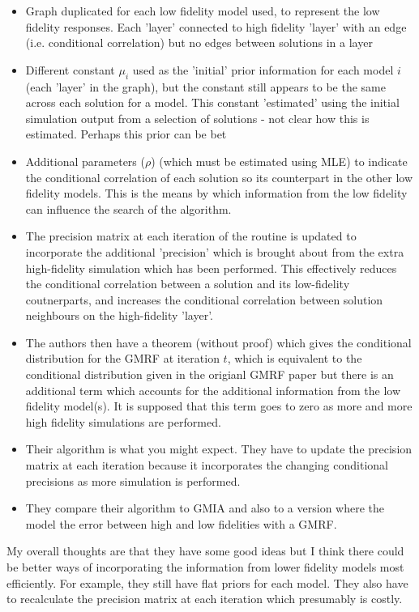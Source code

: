 \documentclass{article}
\begin{document}
\begin{itemize}
\item Graph duplicated for each low fidelity model used, to represent the low fidelity responses. Each 'layer' connected to high fidelity 'layer' with an edge (i.e. conditional correlation) but no edges between solutions in a layer 
\item Different constant $\mu_i$ used as the 'initial' prior information for each model $i$ (each 'layer' in the graph), but the constant still appears to be the same across each solution for a model. This constant 'estimated' using the initial simulation output from a selection of solutions - not clear how this is estimated. Perhaps this prior can be bet
\item Additional parameters ($\rho$) (which must be estimated using MLE) to indicate the conditional correlation of each solution so its counterpart in the other low fidelity models. This is the means by which information from the low fidelity can influence the search of the algorithm.
\item The precision matrix at each iteration of the routine is updated to incorporate the additional 'precision' which is brought about from the extra high-fidelity simulation which has been performed. This effectively reduces the conditional correlation between a solution and its low-fidelity coutnerparts, and increases the conditional correlation between solution neighbours on the high-fidelity 'layer'.
\item The authors then have a theorem (without proof) which gives the conditional distribution for the GMRF at iteration $t$, which is equivalent to the conditional distribution given in the origianl GMRF paper but there is an additional term which accounts for the additional information from the low fidelity model(s). It is supposed that this term goes to zero as more and more high fidelity simulations are performed.
\item Their algorithm is what you might expect. They have to update the precision matrix at each iteration because it incorporates the changing conditional precisions as more simulation is performed.
\item They compare their algorithm to GMIA and also to a version where the model the error between high and low fidelities with a GMRF.
\end{itemize}

My overall thoughts are that they have some good ideas but I think there could be better ways of incorporating the information from lower fidelity models most efficiently. For example, they still have flat priors for each model. They also have to recalculate the precision matrix at each iteration which presumably is costly. 
\end{document}

